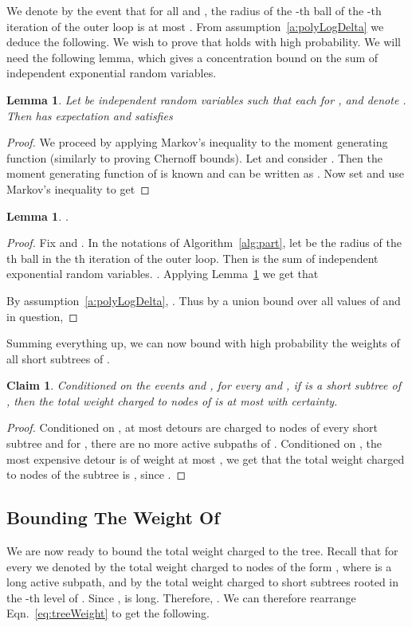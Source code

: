 \documentclass[twoside,leqno,twocolumn]{article}
\newtheorem{claim}[lemma]{Claim}
\newtheorem{lemma}[theorem]{Lemma}
\newtheorem{claim}[theorem]{Claim}
\begin{document}
We denote by  the event that for all  and , the radius of the -th ball of the -th iteration of the outer loop is at most .
\ifprocs
From assumption~\ref{a:polyLogDelta} we deduce the following.
\else
\fi
We wish to prove that  holds with high probability. We will need the following lemma, which gives a concentration bound on the sum of independent exponential random variables.
\begin{lemma}\label{l:conc}
Let  be independent random variables
such that each  for ,
and denote .
Then  
has expectation  
and satisfies

\end{lemma}
\begin{proof}
We proceed by applying Markov's inequality to the moment generating function
(similarly to proving Chernoff bounds).
Let  and consider .
Then the moment generating function of  is known and can be written as
.
Now set  and use Markov's inequality to get

\end{proof}

\begin{lemma} \label{l:radii}
.
\end{lemma}
\begin{proof}
Fix  and . 
In the notations of Algorithm~\ref{alg:part}, let  be the radius of the th ball in the th iteration of the outer loop. Then  is the sum of independent exponential random variables.
. Applying Lemma~\ref{l:conc} we get that 

By assumption~\ref{a:polyLogDelta}, .
Thus by a union bound over all values of  and  in question, 

\end{proof}

Summing everything up, we can now bound with high probability the weights of all short subtrees of . 
\begin{claim} \label{c:shortWeight}
Conditioned on the events  and , for every  and , if  is a short subtree of , then the total weight charged to nodes of  is at most  with certainty.
\end{claim}
\begin{proof}
Conditioned on , at most  detours are charged to nodes of every short subtree and for , there are no more active subpaths of . Conditioned on , the most expensive detour is of weight at most , we get that the total weight charged to nodes of the subtree is , since . \end{proof}
\subsection{Bounding The Weight Of }
We are now ready to bound the total weight charged to the tree. 
Recall that for every  we denoted by  the total weight charged to nodes of the form , where  is a long active subpath, and by  the total weight charged to short subtrees rooted in the -th level of . 
Since ,  is long. Therefore, . We can therefore rearrange Eqn.~\eqref{eq:treeWeight} to get the following.
\end{document}
